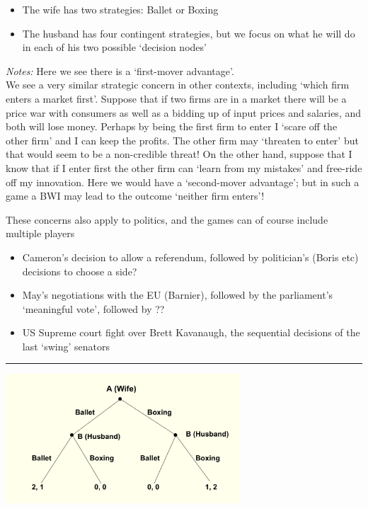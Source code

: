 \documentclass[]{article}
\providecommand{\tightlist}{%
  \setlength{\itemsep}{0pt}\setlength{\parskip}{0pt}}
\begin{document}
\begin{itemize}
\tightlist
\item
  The wife has two strategies: Ballet or Boxing
\item
  The husband has four contingent strategies, but we focus on what he will do in each of his two possible `decision nodes'
\end{itemize}

\emph{Notes:}
Here we see there is a `first-mover advantage'.\\

We see a very similar strategic concern in other contexts, including `which firm enters a market first'. Suppose that if two firms are in a market there will be a price war with consumers as well as a bidding up of input prices and salaries, and both will lose money. Perhaps by being the first firm to enter I `scare off the other firm' and I can keep the profits. The other firm may `threaten to enter' but that would seem to be a non-credible threat! On the other hand, suppose that I know that if I enter first the other firm can `learn from my mistakes' and free-ride off my innovation. Here we would have a `second-mover advantage'; but in such a game a BWI may lead to the outcome `neither firm enters'!

These concerns also apply to politics, and the games can of course include multiple players

\begin{itemize}
\item
  Cameron's decision to allow a referendum, followed by politician's (Boris etc) decisions to choose a side?
\item
  May's negotiations with the EU (Barnier), followed by the parliament's `meaningful vote', followed by ??
\item
  US Supreme court fight over Brett Kavanaugh, the sequential decisions of the last `swing' senators
\end{itemize}

\begin{center}\rule{0.5\linewidth}{\linethickness}\end{center}

\includegraphics[height=1.9in]{picsfigs/BOS_sequential.png}
\end{document}
